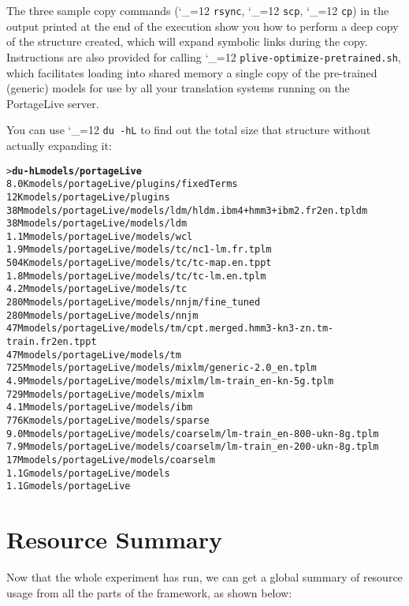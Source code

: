 \documentclass[11pt,letterpaper]{article}
\def\code{\begingroup\catcode`\_=12 \codex}
\newcommand{\codex}[1]{\texttt{#1}\endgroup}
\begin{document}
The three sample copy commands (\code{rsync}, \code{scp}, \code{cp}) in the
output printed at the end of the execution show you how to perform a deep copy
of the structure created, which will expand symbolic links during the copy.
Instructions are also provided for calling \code{plive-optimize-pretrained.sh},
which facilitates loading into shared memory a single copy of the pre-trained
(generic) models for use by all your translation systems running on the
PortageLive server.

You can use \code{du -hL} to find out the total size that structure without
actually expanding it:
\begin{small}
\begin{alltt}
   > \textbf{du -hL models/portageLive}
   8.0K    models/portageLive/plugins/fixedTerms
   12K     models/portageLive/plugins
   38M     models/portageLive/models/ldm/hldm.ibm4+hmm3+ibm2.fr2en.tpldm
   38M     models/portageLive/models/ldm
   1.1M    models/portageLive/models/wcl
   1.9M    models/portageLive/models/tc/nc1-lm.fr.tplm
   504K    models/portageLive/models/tc/tc-map.en.tppt
   1.8M    models/portageLive/models/tc/tc-lm.en.tplm
   4.2M    models/portageLive/models/tc
   280M    models/portageLive/models/nnjm/fine_tuned
   280M    models/portageLive/models/nnjm
   47M     models/portageLive/models/tm/cpt.merged.hmm3-kn3-zn.tm-train.fr2en.tppt
   47M     models/portageLive/models/tm
   725M    models/portageLive/models/mixlm/generic-2.0_en.tplm
   4.9M    models/portageLive/models/mixlm/lm-train_en-kn-5g.tplm
   729M    models/portageLive/models/mixlm
   4.1M    models/portageLive/models/ibm
   776K    models/portageLive/models/sparse
   9.0M    models/portageLive/models/coarselm/lm-train_en-800-ukn-8g.tplm
   7.9M    models/portageLive/models/coarselm/lm-train_en-200-ukn-8g.tplm
   17M     models/portageLive/models/coarselm
   1.1G    models/portageLive/models
   1.1G    models/portageLive
\end{alltt}
\end{small}


\section{Resource Summary} \label{ResourceSummary}

Now that the whole experiment has run, we can get a global summary of resource
usage from all the parts of the framework, as shown below:
\end{document}
